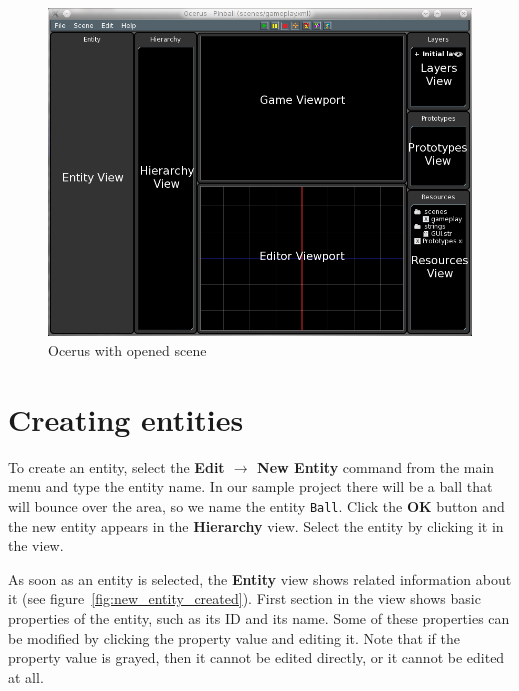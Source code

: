 \documentclass[a4paper,12pt]{article}
\begin{document}
\begin{figure}[ht]
 \begin{center}
  \includegraphics[width=\textwidth]{NewSceneCreated}
 \end{center}
 \caption{Ocerus with opened scene}
 \label{fig:new_scene_created}
\end{figure}


\section{Creating entities}
To create an entity, select the \textbf{Edit $\to$ New Entity} command from the main menu and type the entity name. In our sample project there will be a ball that will bounce over the area, so we name the entity \texttt{Ball}. Click the \textbf{OK} button and the new entity appears in the \textbf{Hierarchy} view. Select the entity by clicking it in the view.

As soon as an entity is selected, the \textbf{Entity} view shows related information about it (see figure~\ref{fig:new_entity_created}). First section in the view shows basic properties of the entity, such as its ID and its name. Some of these properties can be modified by clicking the property value and editing it. Note that if the property value is grayed, then it cannot be edited directly, or it cannot be edited at all.
\end{document}
